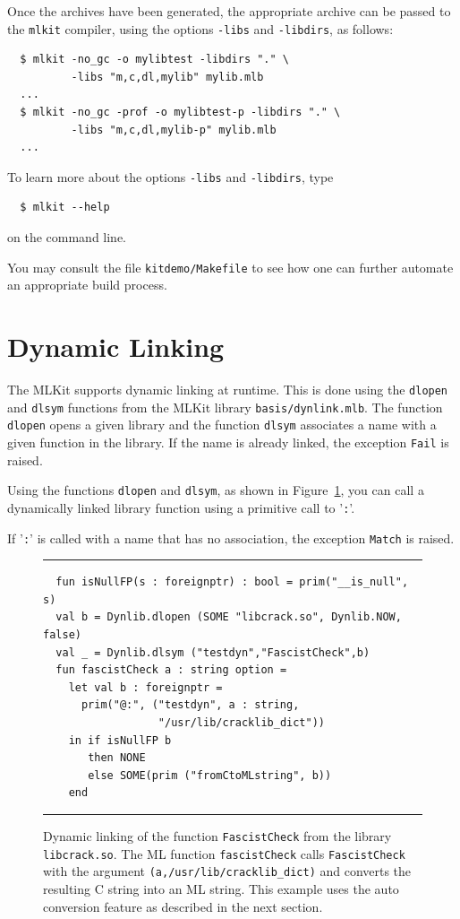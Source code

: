 \documentclass[12pt]{book}
\begin{document}
Once the archives have been generated, the appropriate archive can be
passed to the \texttt{mlkit} compiler, using the options
\texttt{-libs} and \texttt{-libdirs}, as follows: 
\begin{verbatim}
  $ mlkit -no_gc -o mylibtest -libdirs "." \
          -libs "m,c,dl,mylib" mylib.mlb
  ...
  $ mlkit -no_gc -prof -o mylibtest-p -libdirs "." \
          -libs "m,c,dl,mylib-p" mylib.mlb
  ...
\end{verbatim}

\noindent
To learn more about the options
\texttt{-libs} and \texttt{-libdirs}, type
\begin{verbatim}
  $ mlkit --help
\end{verbatim}
on the command line.

You may consult the file \texttt{kitdemo/Makefile} to see how one can
further automate an appropriate build process.

\section{Dynamic Linking}
\label{link_at_runtime.sec}
The MLKit supports 
%
dynamic linking at runtime.  This is done using the
%
\index{dlsym!\texttt{dlsym}}%
\texttt{dlopen} and \texttt{dlsym} functions from the MLKit library
\texttt{basis/dynlink.mlb}. The function \texttt{dlopen} opens a given
library and the function \texttt{dlsym} associates a name with a given
function in the library. If the name is already linked, the exception
\texttt{Fail} is raised.

Using the functions \texttt{dlopen} and \texttt{dlsym}, as shown in
Figure~\ref{dynlib.fig}, you can call a dynamically linked library
function using a primitive call to '\texttt{:}'.

If '\texttt{:}' is called with a name that has no association,
the exception \texttt{Match} is raised.
\begin{figure}
\hrule \medskip
\begin{verbatim}
  fun isNullFP(s : foreignptr) : bool = prim("__is_null", s)
  val b = Dynlib.dlopen (SOME "libcrack.so", Dynlib.NOW, false)
  val _ = Dynlib.dlsym ("testdyn","FascistCheck",b)
  fun fascistCheck a : string option =
    let val b : foreignptr = 
      prim("@:", ("testdyn", a : string, 
                  "/usr/lib/cracklib_dict"))
    in if isNullFP b 
       then NONE 
       else SOME(prim ("fromCtoMLstring", b))
    end
\end{verbatim}
\caption{Dynamic linking of the function \texttt{FascistCheck} from the library \texttt{libcrack.so}.
  The ML function \texttt{fascistCheck} calls \texttt{FascistCheck} with the argument
  \texttt{(a,/usr/lib/cracklib\_dict)} and converts the resulting C string into
  an ML string.
  This example uses the auto conversion feature as described in
  the next section.}
\label{dynlib.fig}
\medskip \hrule
\end{figure}
\end{document}
